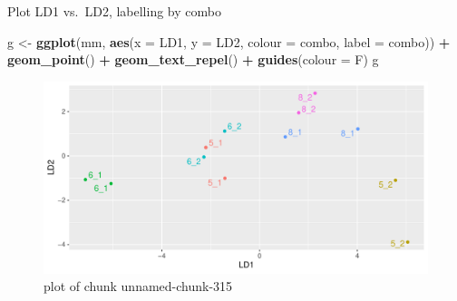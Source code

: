 \documentclass[ignorenonframetext,]{beamer}
\newenvironment{Shaded}{\begin{snugshade}}{\end{snugshade}}
\newcommand{\DataTypeTok}[1]{\textcolor[rgb]{0.13,0.29,0.53}{#1}}
\newcommand{\KeywordTok}[1]{\textcolor[rgb]{0.13,0.29,0.53}{\textbf{#1}}}
\newcommand{\NormalTok}[1]{#1}
\newcommand{\OperatorTok}[1]{\textcolor[rgb]{0.81,0.36,0.00}{\textbf{#1}}}
\newcommand{\StringTok}[1]{\textcolor[rgb]{0.31,0.60,0.02}{#1}}
\begin{document}
\begin{frame}[fragile]{Plot LD1 vs.~LD2, labelling by combo}
\protect\hypertarget{plot-ld1-vs.ld2-labelling-by-combo}{}

\begin{Shaded}
\begin{Highlighting}[]
\NormalTok{g <-}\StringTok{ }\KeywordTok{ggplot}\NormalTok{(mm, }\KeywordTok{aes}\NormalTok{(}\DataTypeTok{x =}\NormalTok{ LD1, }\DataTypeTok{y =}\NormalTok{ LD2, }\DataTypeTok{colour =}\NormalTok{ combo, }
                    \DataTypeTok{label =}\NormalTok{ combo)) }\OperatorTok{+}\StringTok{ }\KeywordTok{geom_point}\NormalTok{() }\OperatorTok{+}
\StringTok{  }\KeywordTok{geom_text_repel}\NormalTok{() }\OperatorTok{+}\StringTok{ }\KeywordTok{guides}\NormalTok{(}\DataTypeTok{colour =}\NormalTok{ F)}
\NormalTok{g}
\end{Highlighting}
\end{Shaded}

\begin{figure}
\centering
\includegraphics{figure/unnamed-chunk-315-1.pdf}
\caption{plot of chunk unnamed-chunk-315}
\end{figure}

\end{frame}
\end{document}
